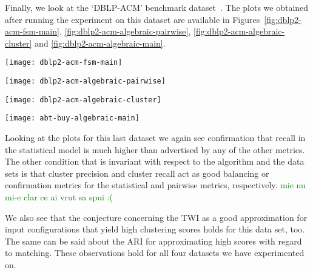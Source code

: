 Finally, we look at the `DBLP-ACM' benchmark dataset~\cite{vldb2010}.
The plots we obtained after running the experiment on this dataset are available
in Figures~\ref{fig:dblp2-acm-fsm-main},
\ref{fig:dblp2-acm-algebraic-pairwise},
\ref{fig:dblp2-acm-algebraic-cluster} and
\ref{fig:dblp2-acm-algebraic-main}.

\begin{figure*}[h]
    \begin{minipage}{0.24\textwidth}
        \centering
        \texttt{[image: dblp2-acm-fsm-main]}
        \caption{DBLP-ACM statistical metrics.}
        \label{fig:dblp2-acm-fsm-main}
    \end{minipage}
    \begin{minipage}{0.24\textwidth}
        \centering
        \texttt{[image: dblp2-acm-algebraic-pairwise]}
        \caption{DBLP-ACM pairwise metrics.}
        \label{fig:dblp2-acm-algebraic-pairwise}
    \end{minipage}
    \begin{minipage}{0.24\textwidth}
        \centering
        \texttt{[image: dblp2-acm-algebraic-cluster]}
        \caption{DBLP-ACM cluster metrics.}
        \label{fig:dblp2-acm-algebraic-cluster}
    \end{minipage}
    \begin{minipage}{0.24\textwidth}
        \centering
        \texttt{[image: abt-buy-algebraic-main]}
        \caption{DBLP-ACM clustering indexes.}
        \label{fig:dblp2-acm-algebraic-main}
    \end{minipage}
\end{figure*}\label{dblp2-acm}

Looking at the plots for this last dataset we again see confirmation that recall
in the statistical model is much higher than advertised by any of the other
metrics.
The other condition that is invariant with respect to the algorithm and the
data sets is that cluster precision and cluster recall act as good balancing or
confirmation metrics for the statistical and pairwise metrics, respectively.
\textcolor{green}{mie nu mi-e clar ce ai vrut sa spui :(}

We also see that the conjecture concerning the TWI as a good approximation for
input configurations that yield high clustering scores holds for this data set,
too. 
The same can be said about the ARI for approximating high scores with regard to
matching.
These observations hold for all four datasets we have experimented on.


